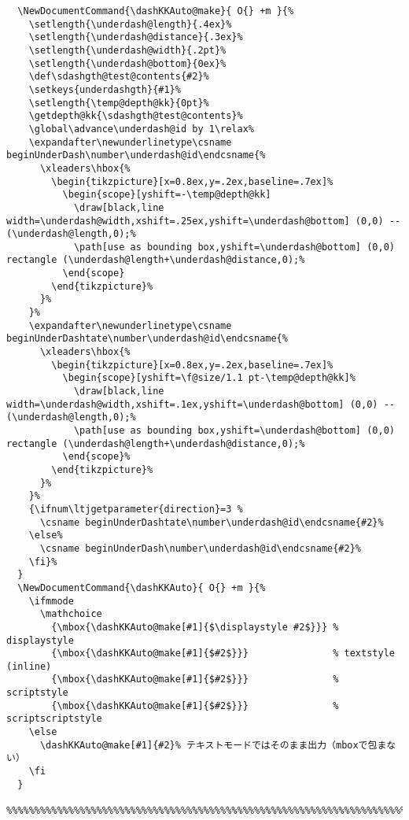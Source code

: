 \documentclass[luatex,fontsize=8pt,paper=b5,twoside]{jlreq}%
\begin{document}
\begin{lstlisting}
  \NewDocumentCommand{\dashKKAuto@make}{ O{} +m }{%
    \setlength{\underdash@length}{.4ex}%
    \setlength{\underdash@distance}{.3ex}%
    \setlength{\underdash@width}{.2pt}%
    \setlength{\underdash@bottom}{0ex}%
    \def\sdashgth@test@contents{#2}%
    \setkeys{underdashgth}{#1}%
    \setlength{\temp@depth@kk}{0pt}%
    \getdepth@kk{\sdashgth@test@contents}%
    \global\advance\underdash@id by 1\relax%
    \expandafter\newunderlinetype\csname beginUnderDash\number\underdash@id\endcsname{%
      \xleaders\hbox{%
        \begin{tikzpicture}[x=0.8ex,y=.2ex,baseline=.7ex]%
          \begin{scope}[yshift=-\temp@depth@kk]
            \draw[black,line width=\underdash@width,xshift=.25ex,yshift=\underdash@bottom] (0,0) -- (\underdash@length,0);%
            \path[use as bounding box,yshift=\underdash@bottom] (0,0) rectangle (\underdash@length+\underdash@distance,0);%
          \end{scope}
        \end{tikzpicture}%
      }%
    }%
    \expandafter\newunderlinetype\csname beginUnderDashtate\number\underdash@id\endcsname{%
      \xleaders\hbox{%
        \begin{tikzpicture}[x=0.8ex,y=.2ex,baseline=.7ex]%
          \begin{scope}[yshift=\f@size/1.1 pt-\temp@depth@kk]%
            \draw[black,line width=\underdash@width,xshift=.1ex,yshift=\underdash@bottom] (0,0) -- (\underdash@length,0);%
            \path[use as bounding box,yshift=\underdash@bottom] (0,0) rectangle (\underdash@length+\underdash@distance,0);%
          \end{scope}%
        \end{tikzpicture}%
      }%
    }%
    {\ifnum\ltjgetparameter{direction}=3 %
      \csname beginUnderDashtate\number\underdash@id\endcsname{#2}%
    \else%
      \csname beginUnderDash\number\underdash@id\endcsname{#2}%
    \fi}%
  }
  \NewDocumentCommand{\dashKKAuto}{ O{} +m }{%
    \ifmmode
      \mathchoice
        {\mbox{\dashKKAuto@make[#1]{$\displaystyle #2$}}} % displaystyle
        {\mbox{\dashKKAuto@make[#1]{$#2$}}}               % textstyle (inline)
        {\mbox{\dashKKAuto@make[#1]{$#2$}}}               % scriptstyle
        {\mbox{\dashKKAuto@make[#1]{$#2$}}}               % scriptscriptstyle
    \else
      \dashKKAuto@make[#1]{#2}% テキストモードではそのまま出力（mboxで包まない）
    \fi
  }
  %%%%%%%%%%%%%%%%%%%%%%%%%%%%%%%%%%%%%%%%%%%%%%%%%%%%%%%%%%%%%%%%%%%%%%%%%%%%%%%%%%%%%%%%%



\end{lstlisting}
\end{document}
